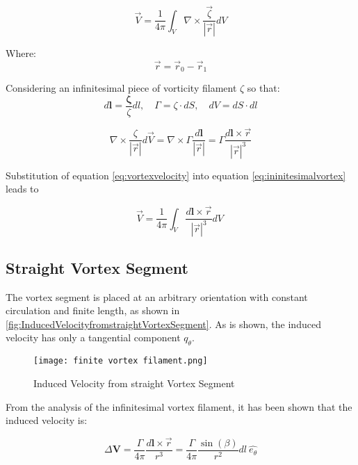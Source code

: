 \begin{equation}
\vec{V} = \frac{1}{4\pi}\int_{V}^{}{\nabla \times \frac{\vec{\zeta}}{\left| \vec{r} \right|}dV}
\end{equation}

Where:
\[\vec{r} = {\vec{r}}_{0} - {\vec{r}}_{1}\]


Considering an infinitesimal piece of vorticity filament $\zeta$ so
that:
\begin{equation}
d\mathbf{l} = \frac{\boldsymbol{\zeta}}{\zeta}dl, \quad \Gamma = \zeta \cdot dS,\quad dV = dS \cdot dl
\end{equation}

\begin{equation}
    \label{eq:ininitesimalvortex}
\nabla \times \frac{\zeta}{\left| \vec{r} \right|}d\vec{V} = \nabla \times \Gamma\frac{d\mathbf{l}}{\left| \vec{r} \right|} = \Gamma\frac{d\mathbf{l} \times \vec{r}}{\left| \vec{r} \right|^{3}}
\end{equation}


Substitution of equation \eqref{eq:vortexvelocity} into equation \eqref{eq:ininitesimalvortex} leads to

\begin{equation}
\vec{V} = \frac{1}{4\pi}\int_{V}^{}{\frac{d\mathbf{l} \times \vec{r}}{\left| \vec{r} \right|^{3}}dV\ }
\end{equation}



\subsection{Straight Vortex Segment}\label{straight-vortex-segment}

The vortex segment is placed at an arbitrary orientation with constant
circulation and finite length, as shown in \autoref{fig:InducedVelocityfromstraightVortexSegment}. As is
shown, the induced velocity has only a tangential component
$q_{\theta}$.

\begin{figure}[H]
    \texttt{[image: finite vortex filament.png]}
    \caption{Induced Velocity from straight Vortex Segment \cite{katz2001}}
    \label{fig:InducedVelocityfromstraightVortexSegment}
\end{figure}

From the analysis of the infinitesimal vortex filament, it has been
shown that the induced velocity is:

\begin{equation}
    \label{eq:inducedvelocity}
\Delta\mathbf{V =}\frac{\Gamma}{4\pi}\frac{d\mathbf{l} \times \vec{r}}{r^{3}} = \frac{\Gamma}{4\pi}\frac{\sin(\beta)}{r^{2}}dl\ \hat{e_{\theta}}
\end{equation}

